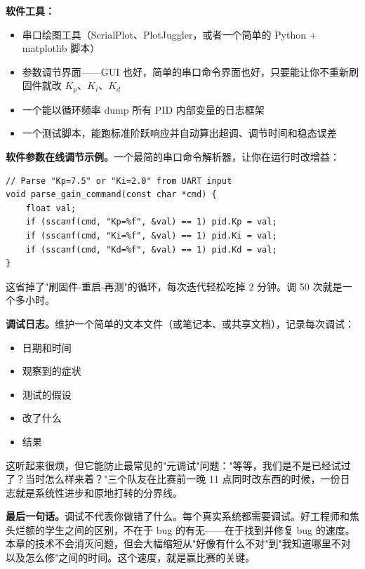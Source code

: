 \textbf{软件工具：}
\begin{itemize}
    \item 串口绘图工具（SerialPlot、PlotJuggler，或者一个简单的 Python + matplotlib 脚本）
    \item 参数调节界面——GUI 也好，简单的串口命令界面也好，只要能让你不重新刷固件就改 $K_p$、$K_i$、$K_d$
    \item 一个能以循环频率 dump 所有 PID 内部变量的日志框架
    \item 一个测试脚本，能跑标准阶跃响应并自动算出超调、调节时间和稳态误差
\end{itemize}

\textbf{软件参数在线调节示例。}一个最简的串口命令解析器，让你在运行时改增益：

\begin{verbatim}
// Parse "Kp=7.5" or "Ki=2.0" from UART input
void parse_gain_command(const char *cmd) {
    float val;
    if (sscanf(cmd, "Kp=%f", &val) == 1) pid.Kp = val;
    if (sscanf(cmd, "Ki=%f", &val) == 1) pid.Ki = val;
    if (sscanf(cmd, "Kd=%f", &val) == 1) pid.Kd = val;
}
\end{verbatim}

这省掉了"刷固件-重启-再测"的循环，每次迭代轻松吃掉 2 分钟。调 50 次就是一个多小时。

\textbf{调试日志。}维护一个简单的文本文件（或笔记本、或共享文档），记录每次调试：
\begin{itemize}
    \item 日期和时间
    \item 观察到的症状
    \item 测试的假设
    \item 改了什么
    \item 结果
\end{itemize}

这听起来很烦，但它能防止最常见的"元调试"问题："等等，我们是不是已经试过了？当时怎么样来着？"三个队友在比赛前一晚 11 点同时改东西的时候，一份日志就是系统性进步和原地打转的分界线。

\vspace{0.5em}

\textbf{最后一句话。}调试不代表你做错了什么。每个真实系统都需要调试。好工程师和焦头烂额的学生之间的区别，不在于 bug 的有无——在于找到并修复 bug 的速度。本章的技术不会消灭问题，但会大幅缩短从"好像有什么不对"到"我知道哪里不对以及怎么修"之间的时间。这个速度，就是赢比赛的关键。
